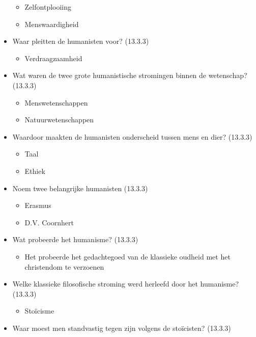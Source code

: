 \begin{itemize}
  \begin{itemize}
  \itemsep1pt\parskip0pt
  \item
    Zelfontplooiing
  \item
    Menswaardigheid
  \end{itemize}
\item
  Waar pleitten de humanisten voor? (13.3.3)

  \begin{itemize}
  \itemsep1pt\parskip0pt
  \item
    Verdraagzaamheid
  \end{itemize}
\item
  Wat waren de twee grote humanistische stromingen binnen de wetenschap?
  (13.3.3)

  \begin{itemize}
  \itemsep1pt\parskip0pt
  \item
    Menswetenschappen
  \item
    Natuurwetenschappen
  \end{itemize}
\item
  Waardoor maakten de humanisten onderscheid tussen mens en dier?
  (13.3.3)

  \begin{itemize}
  \itemsep1pt\parskip0pt
  \item
    Taal
  \item
    Ethiek
  \end{itemize}
\item
  Noem twee belangrijke humanisten (13.3.3)

  \begin{itemize}
  \itemsep1pt\parskip0pt
  \item
    Erasmus
  \item
    D.V. Coornhert
  \end{itemize}
\item
  Wat probeerde het humanisme? (13.3.3)

  \begin{itemize}
  \itemsep1pt\parskip0pt
  \item
    Het probeerde het gedachtegoed van de klassieke oudheid met het
    christendom te verzoenen
  \end{itemize}
\item
  Welke klassieke filosofische stroming werd herleefd door het
  humanisme? (13.3.3)

  \begin{itemize}
  \itemsep1pt\parskip0pt
  \item
    Stoïcisme
  \end{itemize}
\item
  Waar moest men standvastig tegen zijn volgens de stoïcisten? (13.3.3)


\end{itemize}
